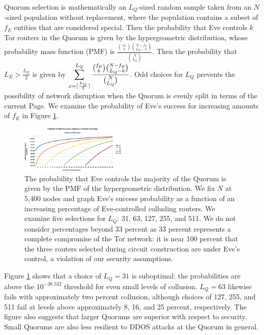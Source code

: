 \documentclass{sig-alternate}
\DeclarePairedDelimiter{\ceil}{\lceil}{\rceil}
\begin{document}
Quorum selection is mathematically an $ L_{Q} $-sized random sample taken from an $ N $-sized population without replacement, where the population contains a subset of $ f_{E} $ entities that are considered special. Then the probability that Eve controls $ k $ Tor routers in the Quorum is given by the hypergeometric distribution, whose probability mass function (PMF) is $ \frac{\binom{f_{E}}{k}\binom{N - f_{E}}{L_{Q} - k}}{\binom{N}{L_{Q}}} $. Then the probability that $ L_{E} > \frac{L_{Q}}{2} $ is given by $ \displaystyle\sum_{x=\ceil{\frac{L_{Q}}{2}}}^{L_{Q}} \frac{\binom{f_{E}}{k}\binom{N - f_{E}}{L_{Q} - k}}{\binom{N}{L_{Q}}} $. Odd choices for $ L_{Q} $ prevents the possibility of network disruption when the Quorum is evenly split in terms of the current Page. We examine the probability of Eve's success for increasing amounts of $ f_{E} $ in Figure \ref{chart:quorumMajority}.

\begin{figure}[htbp]
	\centering
	\includegraphics[width=0.45\textwidth]{../analysis/MaliciousQuorumProbability.eps}
	\caption{The probability that Eve controls the majority of the Quorum is given by the PMF of the hypergeometric distribution. We fix $ N $ at 5,400 nodes and graph Eve's success probability as a function of an increasing percentage of Eve-controlled colluding routers. We examine five selections for $ L_{Q} $: 31, 63, 127, 255, and 511. We do not consider percentages beyond 33 percent as 33 percent represents a complete compromise of the Tor network: it is near 100 percent that the three routers selected during circuit construction are under Eve's control, a violation of our security assumptions.}
	\label{chart:quorumMajority}
\end{figure}

Figure \ref{chart:quorumMajority} shows that a choice of $ L_{Q} = 31 $ is suboptimal: the probabilities are above the $ 10^{-38.532} $ threshold for even small levels of collusion. $ L_{Q} = 63 $ likewise fails with approximately two percent collusion, although choices of 127, 255, and 511 fail at levels above approximately 8, 16, and 25 percent, respectively. The figure also suggests that larger Quorums are superior with respect to security. Small Quorums are also less resilient to DDOS attacks at the Quorum in general.
\end{document}
